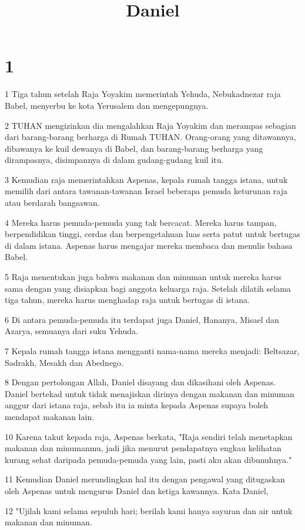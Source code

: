 

\title{Daniel}

\chapter{1}

\par 1 Tiga tahun setelah Raja Yoyakim memerintah Yehuda, Nebukadnezar raja Babel, menyerbu ke kota Yerusalem dan mengepungnya.
\par 2 TUHAN mengizinkan dia mengalahkan Raja Yoyakim dan merampas sebagian dari barang-barang berharga di Rumah TUHAN. Orang-orang yang ditawannya, dibawanya ke kuil dewanya di Babel, dan barang-barang berharga yang dirampasnya, disimpannya di dalam gudang-gudang kuil itu.
\par 3 Kemudian raja memerintahkan Aspenas, kepala rumah tangga istana, untuk memilih dari antara tawanan-tawanan Israel beberapa pemuda keturunan raja atau berdarah bangsawan.
\par 4 Mereka harus pemuda-pemuda yang tak bercacat. Mereka harus tampan, berpendidikan tinggi, cerdas dan berpengetahuan luas serta patut untuk bertugas di dalam istana. Aspenas harus mengajar mereka membaca dan menulis bahasa Babel.
\par 5 Raja menentukan juga bahwa makanan dan minuman untuk mereka harus sama dengan yang disiapkan bagi anggota keluarga raja. Setelah dilatih selama tiga tahun, mereka harus menghadap raja untuk bertugas di istana.
\par 6 Di antara pemuda-pemuda itu terdapat juga Daniel, Hananya, Misael dan Azarya, semuanya dari suku Yehuda.
\par 7 Kepala rumah tangga istana mengganti nama-nama mereka menjadi: Beltsazar, Sadrakh, Mesakh dan Abednego.
\par 8 Dengan pertolongan Allah, Daniel disayang dan dikasihani oleh Aspenas. Daniel bertekad untuk tidak menajiskan dirinya dengan makanan dan minuman anggur dari istana raja, sebab itu ia minta kepada Aspenas supaya boleh mendapat makanan lain.
\par 10 Karena takut kepada raja, Aspenas berkata, "Raja sendiri telah menetapkan makanan dan minumanmu, jadi jika menurut pendapatnya engkau kelihatan kurang sehat daripada pemuda-pemuda yang lain, pasti aku akan dibunuhnya."
\par 11 Kemudian Daniel merundingkan hal itu dengan pengawal yang ditugaskan oleh Aspenas untuk mengurus Daniel dan ketiga kawannya. Kata Daniel,
\par 12 "Ujilah kami selama sepuluh hari; berilah kami hanya sayuran dan air untuk makanan dan minuman.
